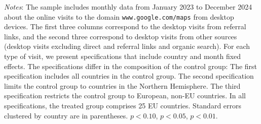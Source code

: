 \documentclass[11pt]{article}
\begin{document}
\begin{table}
\begin{threeparttable}
			\begin{tablenotes}
				\item \footnotesize \emph{Notes}: The sample includes monthly data from January 2023 to December 2024 about the online visits to the domain \texttt{www.google.com/maps} from desktop devices. The first three columns correspond to the desktop visits from referral links, and the second three correspond to desktop visits from other sources (desktop visits excluding direct and referral links and organic search). For each type of visit, we present specifications that include country and month fixed effects. The specifications differ in the composition of the control group: The first specification includes all countries in the control group. The second specification limits the control group to countries in the Northern Hemisphere. The third specification restricts the control group to European, non-EU countries. In all specifications, the treated group comprises 25 EU countries. Standard errors clustered by country are in parentheses. \sym{*} \(p<0.10\), \sym{**} \(p<0.05\), \sym{***}  \(p<0.01\). 
			\end{tablenotes}
		\end{threeparttable}
	\end{table}
	
	
	
\end{document}
